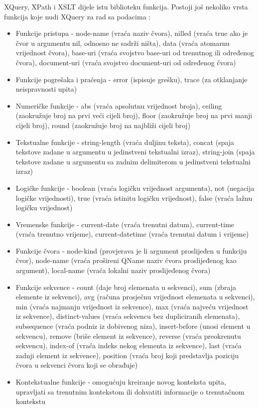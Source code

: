 \documentclass{foi}
\begin{document}
XQuery, XPath i XSLT dijele istu biblioteku funkcija. Postoji još nekoliko vrsta funkcija koje nudi XQuery za rad sa podacima  \cite{javatpoint}:
\begin{itemize}
\item Funkcije pristupa - node-name (vraća naziv čvora), nilled (vraća true ako je čvor u argumentu nil, odnosno ne sadrži ništa), data (vraća atomarnu vrijednost čvora), base-uri (vraća svojstvo base-uri od trenutnog ili određenog čvora), document-uri (vraća svojstvo document-uri od određenog čvora)
\item Funkcije pogrešaka i praćenja - error (ispisuje grešku), trace (za otklanjanje neispravnosti upita)
\item Numeričke funkcije - abs (vraća apsolutnu vrijednost broja), ceiling (zaokružuje broj na prvi veći cijeli broj), floor (zaokružuje broj na prvi manji cijeli broj), round (zaokružuje broj na najbliži cijeli broj)
\item Tekstualne funkcije - string-length (vraća duljinu teksta), concat (spaja tekstove zadane u argumentu u jedinstveni tekstualni izraz), string-join (spaja tekstove zadane u argumentu sa zadnim delimiterom u jedinstveni tekstualni izraz)
\item Logičke funkcije - boolean (vraća logičku vrijednost argumenta), not (negacija logičke vrijednosti), true (vraća istinitu logičku vrijednost), false (vraća lažnu logičku vrijednost)
\item Vremenske funkcije - current-date (vraća trenutni datum), current-time (vraća trenutno vrijeme), current-datetime (vraća trenutni datum i vrijeme)
\item Funkcije čvora - node-kind (provjerava je li argument proslijeđen u funkciju čvor), node-name (vraća prošireni QName naziv čvora proslijeđenog kao argument), local-name (vraća lokalni naziv proslijeđenog čvora)
\item Funkcije sekvence - count (daje broj elemenata u sekvenci), sum (zbraja elemente iz sekvenci), avg (računa prosječnu vrijednost elemenata u sekvenci), min (vraća najmanju vrijednost iz sekvence), max (vraća najveću vrijednost iz sekvence), distinct-values (vraća sekvencu bez dupliciranih elemenata), subsequence (vraća podniz iz dobivenog niza), insert-before (unosi element u sekvencu), remove (briše element iz sekvence), reverse (vraća preokrenutu sekvencu), index-of (vraća indeks nekog elementa iz sekvence), last (vraća zadnji element iz sekvence), position (vraća broj koji predstavlja poziciju čvora u sekvenci čvora koji se obrađuje)
\item Kontekstualne funkcije - omogućuju kreiranje novog konteksta upita, upravljati sa trenutnim kontekstom ili dohvatiti informacije o trenutačnom kontekstu
\end{itemize}
\end{document}
